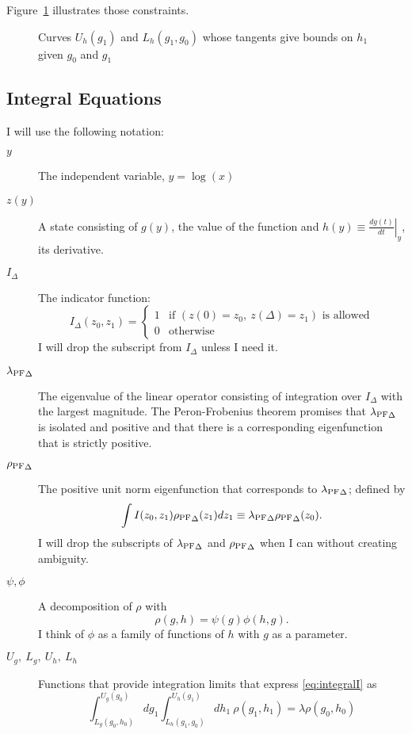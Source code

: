 \documentclass[]{article}
\newcommand\lambdaPF{\lambda_{\rm{PF}}} %
\newcommand\rhoPF{\rho_{\rm{PF}}} %
\begin{document}
Figure~\ref{fig:boundsC} illustrates those constraints.

\begin{figure}
  \centering
    \caption{Curves $U_h(g_1)$ and $L_h(g_1, g_0)$ whose tangents give
      bounds on $h_1$ given $g_0$ and $g_1$}
  \label{fig:boundsC}
\end{figure}

\subsection{Integral Equations}
\label{sec:integral-equations}

I will use the following notation:
\begin{description}
\item[$y$] The independent variable, $y = \log(x)$
\item[$z(y)$] A state consisting of $g(y)$, the value of the function
  and $h(y) \equiv \left. \frac{d g(t)}{d t} \right|_y$, its derivative.
\item[$I_\Delta$] The indicator function:
  \begin{equation}
    \label{eq:indicator}
    I_\Delta(z_0, z_1) =
    \begin{cases}
      1 & \text{if } \left( z(0) = z_0,~z(\Delta)=z_1
      \right) \text{ is allowed} \\
      0 & \text{otherwise}
    \end{cases}
  \end{equation}
  I will drop the subscript from $I_\Delta$ unless I need it.
\item[${\lambdaPF}_\Delta$] The eigenvalue of the linear operator
  consisting of integration over $I_\Delta$ with the largest
  magnitude.  The Peron-Frobenius theorem promises that
  ${\lambdaPF}_\Delta$ is isolated and positive and that there is a
  corresponding eigenfunction that is strictly positive.
\item[${\rhoPF}_\Delta$] The positive unit norm eigenfunction that
  corresponds to ${\lambdaPF}_\Delta$; defined by
  \begin{equation}
    \label{eq:integralI}
    \int I(z_0, z_1) {\rhoPF}_\Delta(z_1) d z_1 \equiv {\lambdaPF}_\Delta
    {\rhoPF}_\Delta(z_0).
  \end{equation}
  I will drop the subscripts of ${\lambdaPF}_\Delta$ and
  ${\rhoPF}_\Delta$ when I can without creating ambiguity.
\item[$\psi, \phi$] A decomposition of $\rho$ with
  \begin{equation*}
    \rho(g,h) = \psi(g) \phi(h,g).
  \end{equation*}
  I think of $\phi$ as a family of functions of $h$ with $g$ as a
  parameter.
\item[$U_g,~L_g,~U_h,~L_h$] Functions that provide integration limits
  that express \eqref{eq:integralI} as
  \begin{equation}
    \label{eq:integralUL_}
    \int_{L_g(g_0,h_0)}^{U_g(g_0)} dg_1
    \int_{L_h(g_1,g_0)}^{U_h(g_1)} dh_1~ \rho(g_1, h_1) = \lambda
    \rho(g_0, h_0)
  \end{equation}
\end{description}
\end{document}
